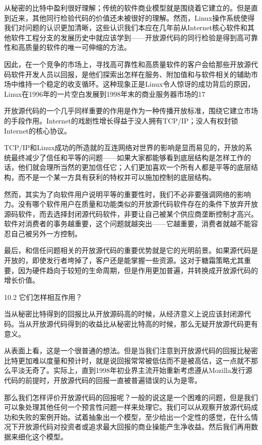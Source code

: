 \documentclass[a4paper,12pt,UTF8,twoside]{ctexbook}
\begin{document}
从秘密的比特中盈利很好理解；传统的软件商业模型就是围绕着它建立的。但是直到近来，其他同行检验代码的价值还未被很好的理解。然而，Linux操作系统使得我们对问题的认识更加清晰，这些认识我们本应在几年前从Internet核心软件和其他软件工程分支的发展历史中就应该学到——开放源代码的同行检验是得到高可靠性和高质量的软件的唯一可伸缩的方法。


因此，在一个竞争的市场上，寻找高可靠性和高质量软件的客户会给那些开放源代码软件开发人员以回报，是他们探索出怎样在服务、附加值和与软件相关的辅助市场中维持一个稳定的收支循环。这种现象正是Linux令人惊讶的成功背后的原因，Linux在1996年的一片空白发展到1998年末的商业服务器市场的17%


开放源代码的一个几乎同样重要的作用是作为一种传播开放标准，围绕它建立市场的手段作用。Internet的戏剧性增长得益于没人拥有TCP/IP；没人有权封锁Internet的核心协议。


TCP/IP和Linux成功的所造就的互连网络对世界的影响是显而易见的，开放的系统最终减少了信任和平等的问题——如果大家都能够看到底层结构是怎样工作的话，他们就会理所当然的更加信任它；人们更加喜欢一个所有人都是平等的底层结构，而不是一个某一方具有获利的特权并可以施加控制的底层结构。


然而，其实为了向软件用户说明平等的重要性时，我们不必非要强调网络的影响力。没有哪个软件用户在质量和功能类似的开放源代码软件存在的条件下放弃开放源码软件，而去选择封闭源代码软件，非要让自己被某个供应商垄断控制才高兴。软件对消费者的事务越重要，这个问题就越突出——它越重要，消费者就越不能容忍自己被另外一方控制。


最后，和信任问题相关的开放源代码的重要优势就是它的光明前景。如果源代码是开放的，即使发行者垮掉了，客户还是能掌握一些资源。这对于糖霜策略尤其重要，因为硬件趋向于较短的生命周期，但是作用更加普遍，并转换成开放源代码的增长价值。


10.2 它们怎样相互作用？


当从秘密比特得到的回报比从开放源码高的时候，从经济意义上说应该封闭源代码。当从开放源代码得到的收益比从秘密比特高的时候，那么无疑开放源代码更有意义。


从表面上看，这是一个很普通的想法。但是当我们注意到开放源代码的回报比秘密比特更加难以度量和预计时，就是说回报常常被低估而不是被高估，这一点就不那么平淡无奇了。实际上，直到1998年初业界主流开始重新考虑遵从Mozilla发行源代码的前提时，开放源代码的回报一直被普遍错误的认为是零。


那么我们怎样评价开放源代码的回报呢？一般的说这是一个困难的问题，但是我们可以象处理其他任何一个预言性问题一样来处理它。我们可以从观察开放源代码成功和失败的案例开始。试着抽象出一个模型，至少给出一个定性的感觉，在什么情况下开放源代码对投资者或追求最大回报的商业操能产生净收益。然后我们再用数据来细化这个模型。
\end{document}
